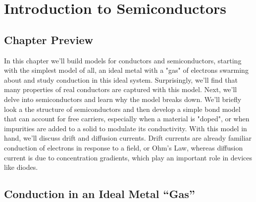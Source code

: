 \chapter{Introduction to Semiconductors}
\graphicspath{{./figs_semi/}}
\section{Chapter Preview}
In this chapter we'll build models for conductors and semiconductors, starting with the simplest model of all, an ideal metal with a "gas" of electrons swarming about and study conduction in this ideal system.  Surprisingly, we'll find that many properties of real conductors are captured with this model.  Next, we'll delve into semiconductors and learn why the model breaks down.  We'll briefly look a the structure of semiconductors and then develop a simple bond model that can account for free carriers, especially when a material is "doped", or when impurities are added to a solid to modulate its conductivity.  With this model in hand, we'll discuss drift and diffusion currents.  Drift currents are already familiar conduction of electrons in response to a field, or Ohm's Law, whereas diffusion current is due to concentration gradients, which play an important role in devices like diodes. 
\section{Conduction in an Ideal Metal ``Gas''}
